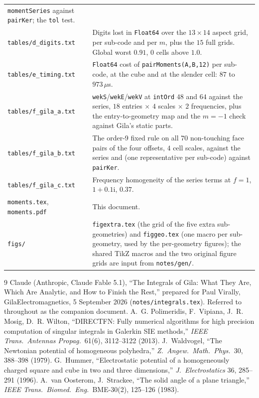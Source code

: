 \documentclass[11pt]{article}
\theoremstyle{remark}
\newcommand{\ii}{\mathrm{i}}
\newcommand{\code}[1]{\texttt{#1}}
\begin{document}
\begin{center}
\begin{tabular}{@{}lp{}@{}}
\code{momentSeries} against \code{pairKer}; the \code{tol} test.\\
\code{tables/d\_digits.txt} &
Digits lost in \code{Float64} over the $13\times14$ aspect grid, per sub-code and per $m$,
plus the $15$ full grids. Global worst $0.91$, $0$ cells above $1.0$.\\
\code{tables/e\_timing.txt} &
\code{Float64} cost of \code{pairMoments(A,B,12)} per sub-code, at the cube and at the
slender cell: $87$ to $973\,\mu$s.\\
\code{tables/f\_gila\_a.txt} &
\code{wekS}/\code{wekE}/\code{wekV} at \code{intOrd} $48$ and $64$ against the series, $18$
entries $\times$ $4$ scales $\times$ $2$ frequencies, plus the entry-to-geometry map and
the $m = -1$ check against Gila's static parts.\\
\code{tables/f\_gila\_b.txt} &
The order-9 fixed rule on all $70$ non-touching face pairs of the four offsets, $4$ cell
scales, against the series and (one representative per sub-code) against \code{pairKer}.\\
\code{tables/f\_gila\_c.txt} &
Frequency homogeneity of the series terms at $f = 1$, $1+0.1\ii$, $0.37$.\\
\addlinespace
\code{moments.tex}, \code{moments.pdf} & This document.\\
\code{figs/} & \code{figextra.tex} (the grid of the five extra sub-geometries) and
\code{figgeo.tex} (one macro per sub-geometry, used by the per-geometry figures); the shared
TikZ macros and the two original figure grids are input from \code{notes/gen/}.\\
\bottomrule
\end{tabular}
\end{center}

\begin{thebibliography}{9}
 Claude (Anthropic, Claude Fable 5.1), ``The Integrals of Gila: What
They Are, Which Are Analytic, and How to Finish the Rest,'' prepared for Paul Virally,
GilaElectromagnetics, 5 September 2026 (\code{notes/integrals.tex}). Referred to throughout
as the companion document.
 A.~G. Polimeridis, F.~Vipiana, J.~R. Mosig, D.~R. Wilton,
``DIRECTFN: Fully numerical algorithms for high precision computation of singular
integrals in Galerkin SIE methods,'' \emph{IEEE Trans.\ Antennas Propag.}\ 61(6),
3112--3122 (2013).
 J.~Waldvogel, ``The Newtonian potential of homogeneous
polyhedra,'' \emph{Z.\ Angew.\ Math.\ Phys.}\ 30, 388--398 (1979).
 G.~Hummer, ``Electrostatic potential of a homogeneously charged
square and cube in two and three dimensions,'' \emph{J.\ Electrostatics} 36,
285--291 (1996).
 A.~van Oosterom, J.~Strackee, ``The solid angle of a plane triangle,''
\emph{IEEE Trans.\ Biomed.\ Eng.}\ BME-30(2), 125--126 (1983).
\end{thebibliography}
\end{document}
